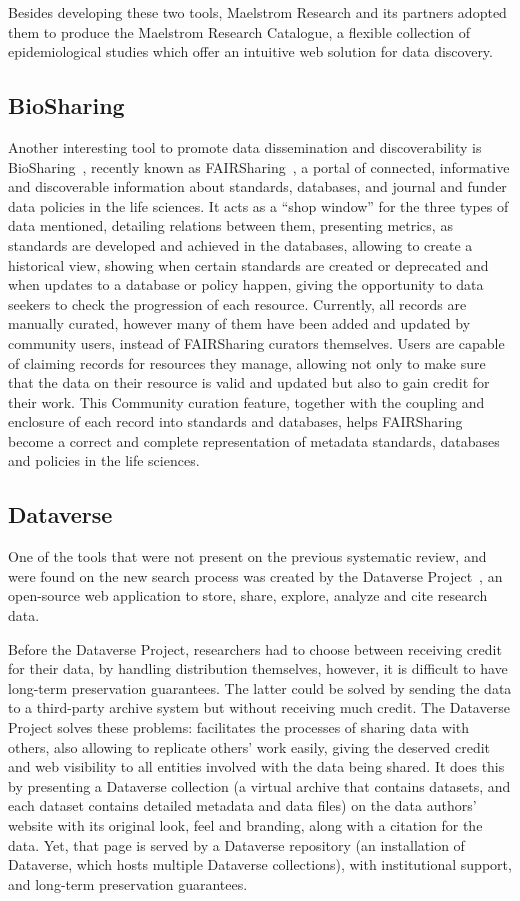 Besides developing these two tools, Maelstrom Research and its partners adopted them to produce the Maelstrom Research Catalogue, a flexible collection of epidemiological studies which offer an intuitive web solution for data discovery.

\subsection*{BioSharing}
Another interesting tool to promote data dissemination and discoverability is BioSharing~\cite{biosharing}, recently known as FAIRSharing~\cite{fairsharing}, a portal of connected, informative and discoverable information about standards, databases, and journal and funder data policies in the life sciences.
It acts as a ``shop window'' for the three types of data mentioned, detailing relations between them, presenting metrics, as standards are developed and achieved in the databases, allowing to create a historical view, showing when certain standards are created or deprecated and when updates to a database or policy happen, giving the opportunity to data seekers to check the progression of each resource.
Currently, all records are manually curated, however many of them have been added and updated by community users, instead of FAIRSharing curators themselves.
Users are capable of claiming records for resources they manage, allowing not only to make sure that the data on their resource is valid and updated but also to gain credit for their work.
This Community curation feature, together with the coupling and enclosure of each record into standards and databases, helps FAIRSharing become a correct and complete representation of metadata standards, databases and policies in the life sciences.

\subsection*{Dataverse}
One of the tools that were not present on the previous systematic review, and were found on the new search process was created by the Dataverse Project~\cite{dataverse}, an open-source web application to store, share, explore, analyze and cite research data.

Before the Dataverse Project, researchers had to choose between receiving credit for their data, by handling distribution themselves, however, it is difficult to have long-term preservation guarantees.
The latter could be solved by sending the data to a third-party archive system but without receiving much credit.
The Dataverse Project solves these problems: facilitates the processes of sharing data with others, also allowing to replicate others' work easily, giving the deserved credit and web visibility to all entities involved with the data being shared.
It does this by presenting a Dataverse collection (a virtual archive that contains datasets, and each dataset contains detailed metadata and data files) on the data authors' website with its original look, feel and branding, along with a citation for the data.
Yet, that page is served by a Dataverse repository (an installation of Dataverse, which hosts multiple Dataverse collections), with institutional support, and long-term preservation guarantees.

